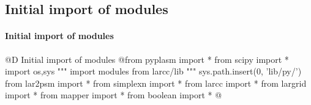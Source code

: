 \documentclass[11pt,oneside]{article}	%
\begin{document}
\subsection{Initial import of modules}

\paragraph{Initial import of modules}

@D Initial import of modules
@{from pyplasm import *
from scipy import *
import os,sys
""" import modules from larcc/lib """
sys.path.insert(0, 'lib/py/')
from lar2psm import *
from simplexn import *
from larcc import *
from largrid import *
from mapper import *
from boolean import *
@}



\end{document}
